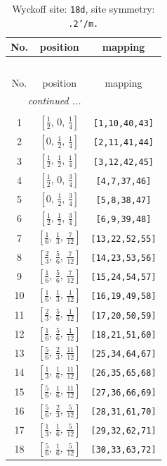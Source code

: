 \documentclass[fleqn,8pt]{jsarticle}
\begin{document}
\begin{longtable}{ccc}
\caption{Wyckoff site: {\tt 18d}, site symmetry: {\tt .2'/m.}}
 \\
 \hline \hline
No. & position & mapping \\ \hline \endfirsthead

\multicolumn{2}{l}{\tablename\ \thetable{}} \\
 \hline \hline
No. & position & mapping \\ \hline \endhead

 \hline \hline
\multicolumn{2}{r}{\footnotesize\it continued ...} \\ \endfoot

 \hline \hline
\multicolumn{2}{r}{} \\ \endlastfoot

1 & $\left[ \frac{1}{2},\, 0,\, \frac{1}{4} \right]$ & {\tt [1,10,40,43]} \\ \hline
2 & $\left[ 0,\, \frac{1}{2},\, \frac{1}{4} \right]$ & {\tt [2,11,41,44]} \\ \hline
3 & $\left[ \frac{1}{2},\, \frac{1}{2},\, \frac{1}{4} \right]$ & {\tt [3,12,42,45]} \\ \hline
4 & $\left[ \frac{1}{2},\, 0,\, \frac{3}{4} \right]$ & {\tt [4,7,37,46]} \\ \hline
5 & $\left[ 0,\, \frac{1}{2},\, \frac{3}{4} \right]$ & {\tt [5,8,38,47]} \\ \hline
6 & $\left[ \frac{1}{2},\, \frac{1}{2},\, \frac{3}{4} \right]$ & {\tt [6,9,39,48]} \\ \hline
7 & $\left[ \frac{1}{6},\, \frac{1}{3},\, \frac{7}{12} \right]$ & {\tt [13,22,52,55]} \\ \hline
8 & $\left[ \frac{2}{3},\, \frac{5}{6},\, \frac{7}{12} \right]$ & {\tt [14,23,53,56]} \\ \hline
9 & $\left[ \frac{1}{6},\, \frac{5}{6},\, \frac{7}{12} \right]$ & {\tt [15,24,54,57]} \\ \hline
10 & $\left[ \frac{1}{6},\, \frac{1}{3},\, \frac{1}{12} \right]$ & {\tt [16,19,49,58]} \\ \hline
11 & $\left[ \frac{2}{3},\, \frac{5}{6},\, \frac{1}{12} \right]$ & {\tt [17,20,50,59]} \\ \hline
12 & $\left[ \frac{1}{6},\, \frac{5}{6},\, \frac{1}{12} \right]$ & {\tt [18,21,51,60]} \\ \hline
13 & $\left[ \frac{5}{6},\, \frac{2}{3},\, \frac{11}{12} \right]$ & {\tt [25,34,64,67]} \\ \hline
14 & $\left[ \frac{1}{3},\, \frac{1}{6},\, \frac{11}{12} \right]$ & {\tt [26,35,65,68]} \\ \hline
15 & $\left[ \frac{5}{6},\, \frac{1}{6},\, \frac{11}{12} \right]$ & {\tt [27,36,66,69]} \\ \hline
16 & $\left[ \frac{5}{6},\, \frac{2}{3},\, \frac{5}{12} \right]$ & {\tt [28,31,61,70]} \\ \hline
17 & $\left[ \frac{1}{3},\, \frac{1}{6},\, \frac{5}{12} \right]$ & {\tt [29,32,62,71]} \\ \hline
18 & $\left[ \frac{5}{6},\, \frac{1}{6},\, \frac{5}{12} \right]$ & {\tt [30,33,63,72]} \\
\end{longtable}
\end{document}
